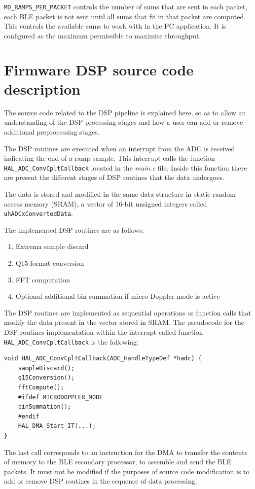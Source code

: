 \texttt{MD\_RAMPS\_PER\_PACKET} controls the number of sums that are sent in each packet, each BLE packet is not sent until all sums that fit in that packet are computed. This controls the available sums to work with in the PC application. It is configured as the maximum permissible to maximise throughput.

\section{Firmware DSP source code description}

The source code related to the DSP pipeline is explained here, so as to allow an understanding of the DSP processing stages and how a user can add or remove additional preprocessing stages.

The DSP routines are executed when an interrupt from the ADC is received indicating the end of a ramp sample. This interrupt calls the function \texttt{HAL\_ADC\_ConvCpltCallback} located in the \textit{main.c} file. Inside this function there are present the different stages of DSP routines that the data undergoes.

The data is stored and modified in the same data structure in static random access memory (SRAM), a vector of 16-bit unsigned integers called \texttt{uhADCxConvertedData}.

The implemented DSP routines are as follows:
\begin{enumerate}
	\item Extrema sample discard
	\item Q15 format conversion
	\item FFT computation
	\item Optional additional bin summation if micro-Doppler mode is active
\end{enumerate}

The DSP routines are implemented as sequential operations or function calls that modify the data present in the vector stored in SRAM. The pseudocode for the DSP routines implementation within the interrupt-called function \texttt{HAL\_ADC\_ConvCpltCallback} is the following:

\begin{verbatim}
void HAL_ADC_ConvCpltCallback(ADC_HandleTypeDef *hadc) {
	sampleDiscard();
	q15Conversion();
	fftCompute();
	#ifdef MICRODOPPLER_MODE
	binSummation();
	#endif
	HAL_DMA_Start_IT(...);
}
\end{verbatim}

The last call corresponds to an instruction for the DMA to transfer the contents of memory to the BLE secondary processor, to assemble and send the BLE packets. It must not be modified if the purposes of source code modification is to add or remove DSP routines in the sequence of data processing.

